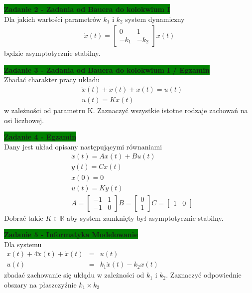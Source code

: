\documentclass[a4paper,11pt]{article}
\begin{document}
\begin{framed}
\textbf{\colorbox{green}{Zadanie 2 - Zadania od Bauera do kolokwium I}} \\ 
Dla jakich wartości parametrów \( k_{1} \) i \( k_{2} \) system dynamiczny 
\begin{align*}
\dot{x}(t)=
\begin{bmatrix}
0 & 1 \\
-k_{1} & -k_{2}
\end{bmatrix}
x(t)
\end{align*}
będzie asymptotycznie stabilny. 
\end{framed}

\begin{framed}
\textbf{\colorbox{green}{Zadanie 3 - Zadania od Bauera do kolokwium I / Egzamin }} \\ 
Zbadać charakter pracy układu 
\begin{align*}
&\ddot{x}(t)+\dot{x}(t)+x(t) = u(t) \\
&u(t)=Kx(t) 
\end{align*}
w zależności od parametru K. Zaznaczyć wszystkie istotne rodzaje zachowań na osi liczbowej. 
\end{framed}

\begin{framed}
\textbf{\colorbox{green}{Zadanie 4 - Egzamin }} \\ 
Dany jest układ opisany następującymi równaniami 
\begin{align*}
&\dot{x}(t)=Ax(t)+Bu(t) \\
&y(t)=Cx(t) \\
&x(0)=0 \\
&u(t)=Ky(t) \\
&A =
\begin{bmatrix}
-1 & 1 \\
-1 & 0 
\end{bmatrix}
B = 
\begin{bmatrix}
0 \\
1
\end{bmatrix}
C =
\begin{bmatrix}
1 & 0
\end{bmatrix} 
\end{align*}
Dobrać takie \( K \in \mathbb{R} \) aby system zamknięty był asymptotycznie stabilny.
\end{framed}

\begin{framed}
\textbf{\colorbox{green}{Zadanie 5 - Informatyka Modelowanie }} \\ 
Dla systemu\\
	$\begin{array}{rcl}x(t)+4\ddot{x}(t)+\dot{x}(t)&=&u(t) \\ u(t)&=&k_1\dot{x}(t)-k_2x(t)\end{array}$\\
zbadać zachowanie się ukłądu w zależności od $k_1$ i $k_2$. Zaznaczyć odpowiednie obszary na płaszczyźnie $k_1 \times k_2$
\end{framed}
\end{document}
